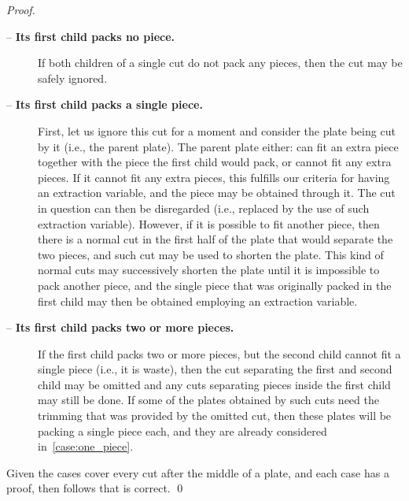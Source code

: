 \documentclass[smallextended]{svjour3}       %
\begin{document}
\begin{proof}
\begin{description}
\item[ -- \textbf{Its first child packs no piece.}]
If both children of a single cut do not pack any pieces, then the cut may be safely ignored.
\item[ -- \textbf{Its first child packs a single piece.}]
First, let us ignore this cut for a moment and consider the plate being cut by it (i.e., the parent plate).
The parent plate either: can fit an extra piece together with the piece the first child would pack, or cannot fit any extra pieces.
If it cannot fit any extra pieces, this fulfills our criteria for having an extraction variable, and the piece may be obtained through it.
The cut in question can then be disregarded (i.e., replaced by the use of such extraction variable).
However, if it is possible to fit another piece, then there is a normal cut in the first half of the plate that would separate the two pieces, and such cut may be used to shorten the plate.
This kind of normal cuts may successively shorten the plate until it is impossible to pack another piece, and the single piece that was originally packed in the first child may then be obtained employing an extraction variable.
\item[ -- \textbf{Its first child packs two or more pieces.}]
If the first child packs two or more pieces, but the second child cannot fit a single piece (i.e., it is waste), then the cut separating the first and second child may be omitted and any cuts separating pieces inside the first child may still be done.
If some of the plates obtained by such cuts need the trimming that was provided by the omitted cut, then these plates will be packing a single piece each, and they are already considered in~\cref{case:one_piece}.
\end{description}

Given the cases cover every cut after the middle of a plate, and each case has a proof, then follows that  is correct. \qed
\end{proof}
\end{document}
